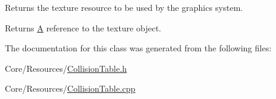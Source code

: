 Returns the texture resource to be used by the graphics system. 

\begin{DoxyReturn}{Returns}
\hyperlink{classA}{A} reference to the texture object. 
\end{DoxyReturn}


The documentation for this class was generated from the following files\-:\begin{DoxyCompactItemize}
\item 
Core/\-Resources/\hyperlink{CollisionTable_8h}{Collision\-Table.\-h}\item 
Core/\-Resources/\hyperlink{CollisionTable_8cpp}{Collision\-Table.\-cpp}\end{DoxyCompactItemize}
